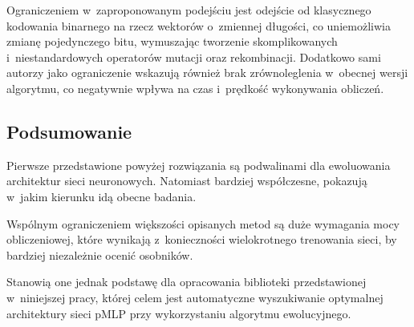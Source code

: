 Ograniczeniem w~zaproponowanym podejściu
jest odejście od klasycznego kodowania
binarnego na rzecz wektorów o~zmiennej długości,
co uniemożliwia zmianę pojedynczego bitu,
wymuszając tworzenie skomplikowanych
i~niestandardowych operatorów
mutacji oraz rekombinacji.
Dodatkowo sami autorzy jako ograniczenie wskazują
również brak zrównoleglenia
w~obecnej wersji algorytmu,
co negatywnie wpływa na czas
i~prędkość wykonywania obliczeń.

\tocless\subsection{Podsumowanie}
Pierwsze przedstawione powyżej rozwiązania
są podwalinami dla ewoluowania
architektur sieci neuronowych.
Natomiast bardziej współczesne,
pokazują w~jakim kierunku idą obecne badania.

Wspólnym ograniczeniem większości opisanych metod
są duże wymagania mocy obliczeniowej,
które wynikają z~konieczności
wielokrotnego trenowania sieci,
by bardziej niezależnie ocenić osobników.

Stanowią one jednak podstawę dla opracowania
biblioteki przedstawionej w~niniejszej pracy,
której celem jest automatyczne wyszukiwanie
optymalnej architektury sieci \gls{pMLP} przy
wykorzystaniu algorytmu ewolucyjnego.

